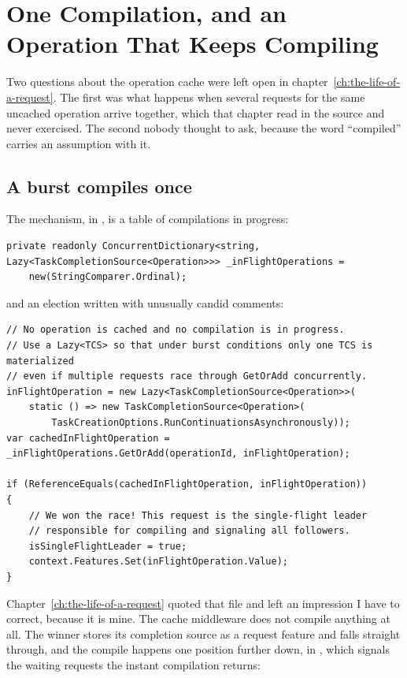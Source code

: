 \section{One Compilation, and an Operation That Keeps Compiling}
\label{sec:ch16-one-compilation}
%

Two questions about the operation cache were left open in
chapter~\ref{ch:the-life-of-a-request}. The first was what happens when several
requests for the same uncached operation arrive together, which that chapter read
in the source and never exercised. The second nobody thought to ask, because the
word \enquote{compiled} carries an assumption with it.

\subsection*{A burst compiles once}

%
The mechanism, in , is a table of compilations
in progress:

\begin{verbatim}
private readonly ConcurrentDictionary<string, Lazy<TaskCompletionSource<Operation>>> _inFlightOperations =
    new(StringComparer.Ordinal);
\end{verbatim}

and an election written with unusually candid comments:

\begin{verbatim}
// No operation is cached and no compilation is in progress.
// Use a Lazy<TCS> so that under burst conditions only one TCS is materialized
// even if multiple requests race through GetOrAdd concurrently.
inFlightOperation = new Lazy<TaskCompletionSource<Operation>>(
    static () => new TaskCompletionSource<Operation>(
        TaskCreationOptions.RunContinuationsAsynchronously));
var cachedInFlightOperation = _inFlightOperations.GetOrAdd(operationId, inFlightOperation);

if (ReferenceEquals(cachedInFlightOperation, inFlightOperation))
{
    // We won the race! This request is the single-flight leader
    // responsible for compiling and signaling all followers.
    isSingleFlightLeader = true;
    context.Features.Set(inFlightOperation.Value);
}
\end{verbatim}

%
Chapter~\ref{ch:the-life-of-a-request} quoted that file and left an impression I
have to correct, because it is mine. The cache middleware does not compile
anything at all. The winner stores its completion source as a request feature
and falls straight through, and the compile happens one position further down,
in , which signals the waiting requests the
instant compilation returns:

